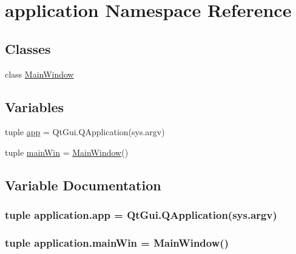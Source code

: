 \hypertarget{namespaceapplication}{}\section{application Namespace Reference}
\label{namespaceapplication}
\subsection*{Classes}
\begin{DoxyCompactItemize}
\item 
class \hyperlink{classapplication_1_1MainWindow}{Main\+Window}
\end{DoxyCompactItemize}
\subsection*{Variables}
\begin{DoxyCompactItemize}
\item 
tuple \hyperlink{namespaceapplication_a0cf0fe4d8f97ea1e8707749e1cb44f96}{app} = Qt\+Gui.\+Q\+Application(sys.\+argv)
\item 
tuple \hyperlink{namespaceapplication_a5ce0237af85caef4398cf53e40d14a07}{main\+Win} = \hyperlink{classapplication_1_1MainWindow}{Main\+Window}()
\end{DoxyCompactItemize}


\subsection{Variable Documentation}
\hypertarget{namespaceapplication_a0cf0fe4d8f97ea1e8707749e1cb44f96}{}
\subsubsection[{app}]{\setlength{\rightskip}{0pt plus 5cm}tuple application.\+app = Qt\+Gui.\+Q\+Application(sys.\+argv)}\label{namespaceapplication_a0cf0fe4d8f97ea1e8707749e1cb44f96}
\hypertarget{namespaceapplication_a5ce0237af85caef4398cf53e40d14a07}{}
\subsubsection[{main\+Win}]{\setlength{\rightskip}{0pt plus 5cm}tuple application.\+main\+Win = {\bf Main\+Window}()}\label{namespaceapplication_a5ce0237af85caef4398cf53e40d14a07}
